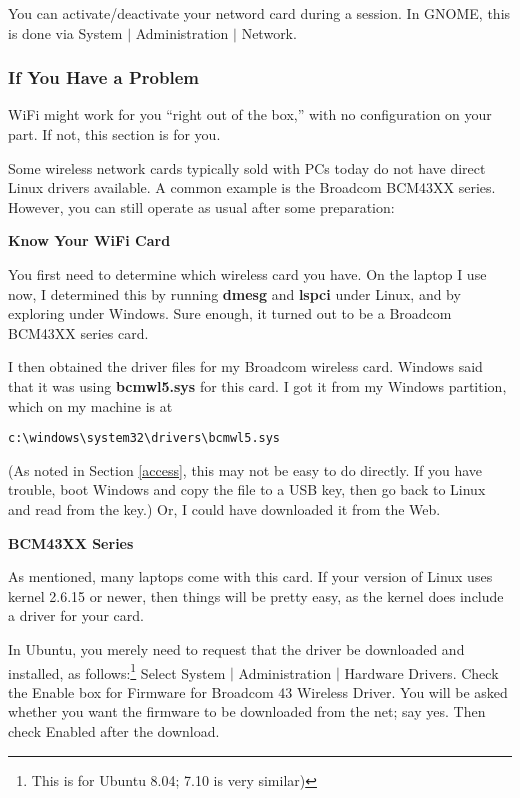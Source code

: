 \documentclass[11pt]{article}
\begin{document}
You can activate/deactivate your netword card during a session.  In
GNOME, this is done via System $|$ Administration $|$ Network.

\subsubsection{If You Have a Problem}

WiFi might work for you ``right out of the box,'' with no configuration
on your part.  If not, this section is for you.

Some wireless network cards typically sold with PCs today do not have
direct Linux drivers available.  A common example is the Broadcom
BCM43XX series.  However, you can still operate as usual after some
preparation:  

\textbf{Know Your WiFi Card}

You first need to determine which wireless card you have.  On the laptop
I use now, I determined this by running {\bf dmesg} and {\bf lspci}
under Linux, and by exploring under Windows.  Sure enough, it turned out
to be a Broadcom BCM43XX series card.

I then obtained the driver files for my Broadcom wireless card.  Windows
said that it was using {\bf bcmwl5.sys} for this card.  I got it from my
Windows partition, which on my machine is at

\begin{Verbatim}[fontsize=\relsize{-2}]
c:\windows\system32\drivers\bcmwl5.sys 
\end{Verbatim}

(As noted in Section \ref{access}, this may not be easy to do directly.
If you have trouble, boot Windows and copy the file to a USB key, then
go back to Linux and read from the key.)  Or, I could have downloaded it
from the Web.

\textbf{BCM43XX Series}

As mentioned, many laptops come with this card.  If your version of
Linux uses kernel 2.6.15 or newer, then things will be pretty easy, as
the kernel does include a driver for your card.

In Ubuntu, you merely need to request that the driver be downloaded and
installed, as follows:\footnote{This is for Ubuntu 8.04; 7.10 is very
similar)}  Select System $|$ Administration $|$ Hardware Drivers.  Check
the Enable box for Firmware for Broadcom 43 Wireless Driver.  You will
be asked whether you want the firmware to be downloaded from the net;
say yes.  Then check Enabled after the download.
\end{document}

